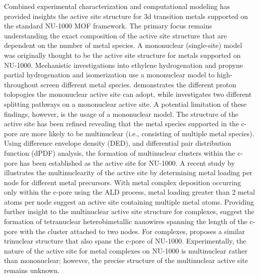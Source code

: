 Combined experimental characterization and computational modeling has provided insights the active site structure for 3d transition metals supported on the standard NU-1000 MOF framework. The primary focus remains understanding the exact composition of the active site structure that are dependent on the number of metal species. A mononuclear (single-site) model was originally thought to be the active site structure for metals supported on NU-1000.\cite{Li2016sintering,AbdelMageed2019,Gallington2016} Mechanistic investigations into ethylene hydrogenation\cite{Shabbir2020} and propyne partial hydrogenation and isomerization\cite{Hackler2020} use a mononuclear model to high-throughout screen different metal species. \citeauthor{Shabbir2020} demonstrates the different proton tolopogies the mononuclear active site can adopt,\cite{Shabbir2020} while \citeauthor{Hackler2020} investigates two different  splitting pathways on a mononuclear active site.\cite{Hackler2020} A potential limitation of these findings, however, is the usage of a mononuclear model. The structure of the active site has been refined revealing that the metal species supported in the c-pore are more likely to be multinuclear (i.e., consisting of multiple metal species). Using difference envelope density (DED),\cite{Li2017} and differential pair distribution function (dPDF) analysis,\cite{PlateroPrats2017} the formation of multinuclear clusters within the c-pore has been established as the active site for NU-1000. A recent study by \citeauthor{Kim2020}  illustrates the multinuclearity of the active site by determining metal loading per node for different metal precursors.\cite{Kim2020} With metal complex deposition occurring only within the c-pore using the ALD process, metal loading greater than 2 metal atoms per node suggest an active site containing multiple metal atoms. Providing further insight to the multinuclear active site structure for  complexes, \citeauthor{PlateroPrats2017} suggest the formation of tetranuclear heterobimetallic nanowires spanning the length of the c-pore with the cluster attached to two nodes.\citeauthor{PlateroPrats2017} For  complexes, \citeauthor{Ikuno2017} proposes a similar trinuclear structure that also spans the c-pore of NU-1000. Experimentally, the nature of the active site for metal complexes on NU-1000 is multinuclear rather than mononuclear; however, the precise structure of the multinuclear active site remains unknown. 

